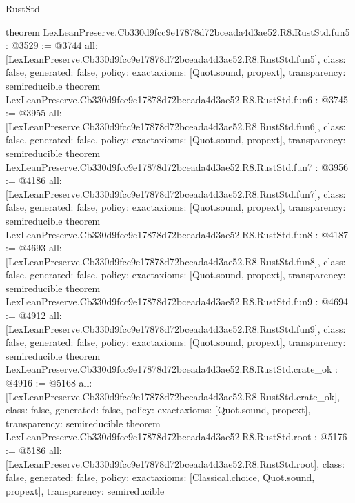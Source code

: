 \begin{lexlean}{RustStd}
\begin{coremodule}
{}
theorem LexLeanPreserve.Cb330d9fcc9e17878d72bceada4d3ae52.R8.RustStd.fun5 : @3529 := @3744 {
  all: [LexLeanPreserve.Cb330d9fcc9e17878d72bceada4d3ae52.R8.RustStd.fun5],
  class: false,
  generated: false,
  policy: exact{axioms: [Quot.sound, propext]},
  transparency: semireducible
}
theorem LexLeanPreserve.Cb330d9fcc9e17878d72bceada4d3ae52.R8.RustStd.fun6 : @3745 := @3955 {
  all: [LexLeanPreserve.Cb330d9fcc9e17878d72bceada4d3ae52.R8.RustStd.fun6],
  class: false,
  generated: false,
  policy: exact{axioms: [Quot.sound, propext]},
  transparency: semireducible
}
theorem LexLeanPreserve.Cb330d9fcc9e17878d72bceada4d3ae52.R8.RustStd.fun7 : @3956 := @4186 {
  all: [LexLeanPreserve.Cb330d9fcc9e17878d72bceada4d3ae52.R8.RustStd.fun7],
  class: false,
  generated: false,
  policy: exact{axioms: [Quot.sound, propext]},
  transparency: semireducible
}
theorem LexLeanPreserve.Cb330d9fcc9e17878d72bceada4d3ae52.R8.RustStd.fun8 : @4187 := @4693 {
  all: [LexLeanPreserve.Cb330d9fcc9e17878d72bceada4d3ae52.R8.RustStd.fun8],
  class: false,
  generated: false,
  policy: exact{axioms: [Quot.sound, propext]},
  transparency: semireducible
}
theorem LexLeanPreserve.Cb330d9fcc9e17878d72bceada4d3ae52.R8.RustStd.fun9 : @4694 := @4912 {
  all: [LexLeanPreserve.Cb330d9fcc9e17878d72bceada4d3ae52.R8.RustStd.fun9],
  class: false,
  generated: false,
  policy: exact{axioms: [Quot.sound, propext]},
  transparency: semireducible
}
theorem LexLeanPreserve.Cb330d9fcc9e17878d72bceada4d3ae52.R8.RustStd.crate_ok : @4916 := @5168 {
  all: [LexLeanPreserve.Cb330d9fcc9e17878d72bceada4d3ae52.R8.RustStd.crate_ok],
  class: false,
  generated: false,
  policy: exact{axioms: [Quot.sound, propext]},
  transparency: semireducible
}
theorem LexLeanPreserve.Cb330d9fcc9e17878d72bceada4d3ae52.R8.RustStd.root : @5176 := @5186 {
  all: [LexLeanPreserve.Cb330d9fcc9e17878d72bceada4d3ae52.R8.RustStd.root],
  class: false,
  generated: false,
  policy: exact{axioms: [Classical.choice, Quot.sound, propext]},
  transparency: semireducible
}


\end{coremodule}
\end{lexlean}
